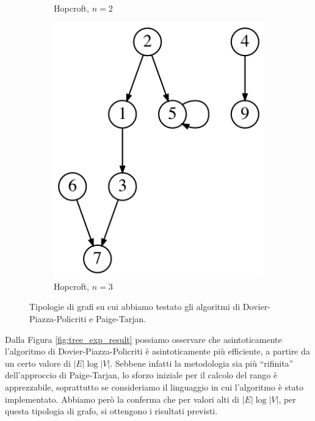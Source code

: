 \begin{figure}
\begin{subfigure}[b]{0.1\textwidth}
        \caption{Hopcroft, $n=2$}
        \label{fig:hopcroft_graph_1}
    \end{subfigure}
    \qquad \qquad
    \begin{subfigure}[b]{0.2\textwidth}
        \centering
        \includegraphics[width=\textwidth]{./sezione3/experimental_results/plots/hopcroft_graph_2.png}
        \caption{Hopcroft, $n=3$}
        \label{fig:hopcroft_graph_2}
    \end{subfigure}
    \caption{Tipologie di grafi su cui abbiamo testato gli algoritmi di Dovier-Piazza-Policriti e Paige-Tarjan.}
\end{figure}

Dalla Figura \ref{fig:tree_exp_result} possiamo osservare che asintoticamente l'algoritmo di Dovier-Piazza-Policriti è asintoticamente più efficiente, a partire da un certo valore di $|E| \log |V|$. Sebbene infatti la metodologia sia più ``rifinita'' dell'approccio di Paige-Tarjan, lo sforzo iniziale per il calcolo del rango è apprezzabile, soprattutto se consideriamo il linguaggio in cui l'algoritmo è stato implementato. Abbiamo però la conferma che per valori alti di $|E| \log |V|$, per questa tipologia di grafo, si ottengono i risultati previsti.

